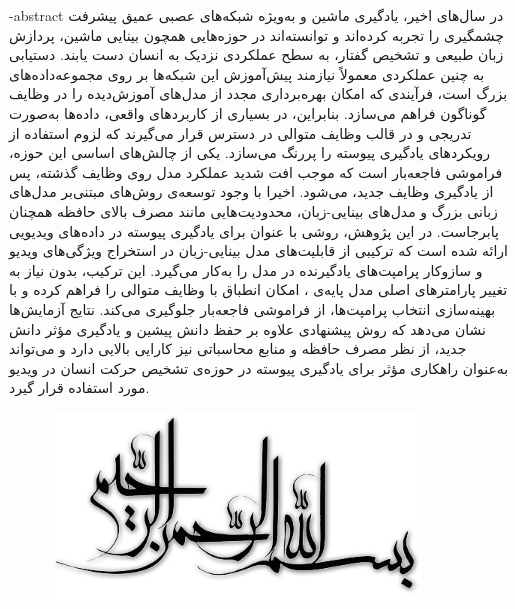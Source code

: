 
\fa-abstract{
در سال‌های اخیر، یادگیری ماشین و به‌ویژه شبکه‌های عصبی عمیق پیشرفت چشمگیری را تجربه کرده‌اند و توانسته‌اند در حوزه‌هایی همچون بینایی ماشین، پردازش زبان طبیعی و تشخیص گفتار، به سطح عملکردی نزدیک به انسان دست یابند. دستیابی به چنین عملکردی معمولاً نیازمند پیش‌آموزش این شبکه‌ها بر روی مجموعه‌داده‌های بزرگ است، فرآیندی که امکان بهره‌برداری مجدد از مدل‌های آموزش‌دیده را در وظایف گوناگون فراهم می‌سازد.
بنابراین، در بسیاری از کاربردهای واقعی، داده‌ها به‌صورت تدریجی و در قالب وظایف متوالی در دسترس قرار می‌گیرند که لزوم استفاده از رویکردهای یادگیری پیوسته را پررنگ می‌سازد. یکی از چالش‌های اساسی این حوزه، فراموشی فاجعه‌بار است که موجب افت شدید عملکرد مدل روی وظایف گذشته، پس از یادگیری وظایف جدید، می‌شود. اخیرا با وجود توسعه‌ی روش‌های مبتنی‌بر مدل‌های زبانی بزرگ و مدل‌های بینایی-زبان، محدودیت‌هایی مانند مصرف بالای حافظه همچنان پابرجاست.
در این پژوهش، روشی با عنوان  برای یادگیری پیوسته در داده‌های ویدیویی ارائه شده است که ترکیبی از قابلیت‌های مدل بینایی-زبان  در استخراج ویژگی‌های ویدیو و سازوکار پرامپت‌های یادگیرنده در مدل  را به‌کار می‌گیرد. این ترکیب، بدون نیاز به تغییر پارامترهای اصلی مدل پایه‌ی ، امکان انطباق با وظایف متوالی را فراهم کرده و با بهینه‌سازی انتخاب پرامپت‌ها، از فراموشی فاجعه‌بار جلوگیری می‌کند. نتایج آزمایش‌ها نشان می‌دهد که روش پیشنهادی علاوه بر حفظ دانش پیشین و یادگیری مؤثر دانش جدید، از نظر مصرف حافظه و منابع محاسباتی نیز کارایی بالایی دارد و می‌تواند به‌عنوان راهکاری مؤثر برای یادگیری پیوسته در حوزه‌ی تشخیص حرکت انسان در ویدیو مورد استفاده قرار گیرد.
}





\AUTtitle
\vspace*{7cm}
\thispagestyle{empty}
\begin{center}
\includegraphics[height=5cm,width=12cm]{Images/besm.jpg}
\end{center}